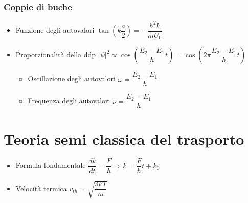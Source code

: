 \documentclass{article}
\begin{document}
\newpage

\subsubsection{Coppie di buche}
\begin{itemize}
  \item Funzione degli autovalori \( \tan\left( k \dfrac{a}{2} \right) = - \dfrac{\hbar ^2 k}{m U_0} \)
  \item Proporzionalità della ddp \( \left| \psi \right| ^ 2 \propto \cos \left( \dfrac{E_2 - E_1}{\hbar} t \right) = \cos \left( 2 \pi \dfrac{E_2 - E_1}{h} t \right)  \)
        \begin{itemize}
          \item Oscillazione degli autovalori \( \omega = \dfrac{E_2 - E_1}{\hbar} \)
          \item Frequenza degli autovalori \( \nu = \dfrac{E_2 - E_1}{h} \)
        \end{itemize}
\end{itemize}

\section{Teoria semi classica del trasporto}
\begin{itemize}
  \item Formula fondamentale \( \dfrac{dk}{dt} = \dfrac{F}{\hbar} \Rightarrow k = \dfrac{F}{\hbar} t + k_0 \)
  \item Velocità termica \( \displaystyle v_{th} = \sqrt{\dfrac{3 k T}{m}} \)
\end{itemize}
\end{document}
